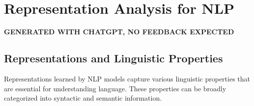 \section{Representation Analysis for NLP}
{\Large \textbf{GENERATED WITH CHATGPT, NO FEEDBACK EXPECTED}}

\subsection{Representations and Linguistic Properties}

Representations learned by NLP models capture various linguistic properties that are essential for understanding language. These properties can be broadly categorized into syntactic and semantic information.

